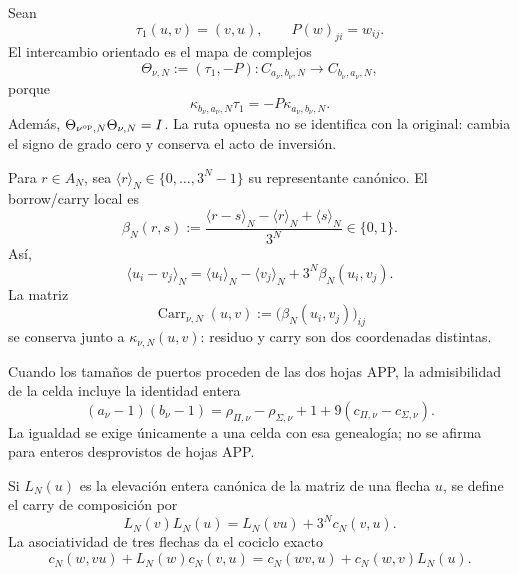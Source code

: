 Sean
\[
 \tau_1(u,v)=(v,u),
 \qquad
 P(w)_{ji}=w_{ij}.
\]
El intercambio orientado es el mapa de complejos
\begin{equation}\label{eq:pdfv2-coh-theta}
 \Theta_{\nu,N}:=(\tau_1,-P):
 C_{a_\nu,b_\nu,N}\longrightarrow C_{b_\nu,a_\nu,N},
\end{equation}
porque
\begin{equation}\label{eq:pdfv2-coh-orientation}
 \kappa_{b_\nu,a_\nu,N}\tau_1
 =-P\kappa_{a_\nu,b_\nu,N}.
\end{equation}
Además,
\(\Theta_{\nu^{\rm op},N}\Theta_{\nu,N}=I\). La ruta opuesta no se
identifica con la original: cambia el signo de grado cero y conserva el acto
de inversión.

Para \(r\in A_N\), sea
\(\langle r\rangle_N\in\{0,\ldots,3^N-1\}\) su representante canónico. El
borrow/carry local es
\begin{equation}\label{eq:pdfv2-coh-beta}
 \beta_N(r,s):=
 \frac{\langle r-s\rangle_N-\langle r\rangle_N+\langle s\rangle_N}
 {3^N}\in\{0,1\}.
\end{equation}
Así,
\begin{equation}\label{eq:pdfv2-coh-carry-cell}
 \langle u_i-v_j\rangle_N
 =\langle u_i\rangle_N-\langle v_j\rangle_N
  +3^N\beta_N(u_i,v_j).
\end{equation}
La matriz
\[
 \operatorname{Carr}_{\nu,N}(u,v)
 :=\bigl(\beta_N(u_i,v_j)\bigr)_{ij}
\]
se conserva junto a \(\kappa_{\nu,N}(u,v)\): residuo y carry son dos
coordenadas distintas.

Cuando los tamaños de puertos proceden de las dos hojas APP, la admisibilidad
de la celda incluye la identidad entera
\begin{equation}\label{eq:pdfv2-coh-app-defect}
 (a_\nu-1)(b_\nu-1)
 =\rho_{\Pi,\nu}-\rho_{\Sigma,\nu}+1
  +9(c_{\Pi,\nu}-c_{\Sigma,\nu}).
\end{equation}
La igualdad se exige únicamente a una celda con esa genealogía; no se afirma
para enteros desprovistos de hojas APP.

Si \(L_N(u)\) es la elevación entera canónica de la matriz de una flecha
\(u\), se define el carry de composición por
\begin{equation}\label{eq:pdfv2-coh-carry-composition}
 L_N(v)L_N(u)=L_N(vu)+3^N c_N(v,u).
\end{equation}
La asociatividad de tres flechas da el cociclo exacto
\begin{equation}\label{eq:pdfv2-coh-carry-cocycle}
 c_N(w,vu)+L_N(w)c_N(v,u)
 =c_N(wv,u)+c_N(w,v)L_N(u).
\end{equation}

